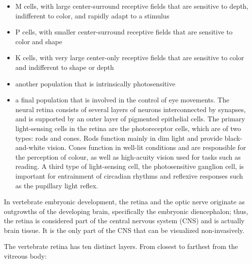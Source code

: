 \begin{itemize}
\tightlist
\item
  M cells, with large center-surround receptive fields that are
  sensitive to depth, indifferent to color, and rapidly adapt to a
  stimulus
\item
  P cells, with smaller center-surround receptive fields that are
  sensitive to color and shape
\item
  K cells, with very large center-only receptive fields that are
  sensitive to color and indifferent to shape or depth
\item
  another population that is intrinsically photosensitive
\item
  a final population that is involved in the control of eye movements.
  The neural retina consists of several layers of neurons interconnected
  by synapses, and is supported by an outer layer of pigmented
  epithelial cells. The primary light-sensing cells in the retina are
  the photoreceptor cells, which are of two types: rods and cones. Rods
  function mainly in dim light and provide black-and-white vision. Cones
  function in well-lit conditions and are responsible for the perception
  of colour, as well as high-acuity vision used for tasks such as
  reading. A third type of light-sensing cell, the photosensitive
  ganglion cell, is important for entrainment of circadian rhythms and
  reflexive responses such as the pupillary light reflex.
\end{itemize}

In vertebrate embryonic development, the retina and the optic nerve
originate as outgrowths of the developing brain, specifically the
embryonic diencephalon; thus, the retina is considered part of the
central nervous system (CNS) and is actually brain tissue. It is the
only part of the CNS that can be visualized non-invasively.

The vertebrate retina has ten distinct layers. From closest to farthest
from the vitreous body:

